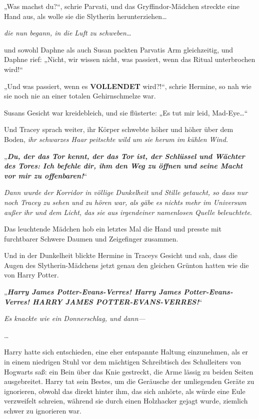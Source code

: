 {„Was machst du?“, schrie Parvati, und das Gryffindor-Mädchen streckte eine Hand aus, als wolle sie die Slytherin herunterziehen…

\emph{die nun begann, in die Luft zu schweben…}

und sowohl Daphne als auch Susan packten Parvatis Arm gleichzeitig, und Daphne rief: „Nicht, wir wissen nicht, was passiert, wenn das Ritual unterbrochen wird!“

„Und was passiert, wenn es \textbf{VOLLENDET} wird?!“, schrie Hermine, so nah wie sie noch nie an einer totalen Gehirnschmelze war.

Susans Gesicht war kreidebleich, und sie flüsterte: „Es tut mir leid, Mad-Eye…“

Und Tracey sprach weiter, ihr Körper schwebte höher und höher über dem Boden, \emph{ihr schwarzes Haar peitschte wild um sie herum im kühlen Wind.}

„\textbf{\emph{Du, der das Tor kennt, der das Tor ist, der Schlüssel und Wächter des Tores: Ich befehle dir, ihm den Weg zu öffnen und seine Macht vor mir zu offenbaren!}}“

\emph{Dann wurde der Korridor in völlige Dunkelheit und Stille getaucht, so dass nur noch Tracey zu sehen und zu hören war, als gäbe es nichts mehr im Universum außer ihr und dem Licht, das sie aus irgendeiner namenlosen Quelle beleuchtete}.

Das leuchtende Mädchen hob ein letztes Mal die Hand und presste mit furchtbarer Schwere Daumen und Zeigefinger zusammen.

Und in der Dunkelheit blickte Hermine in Traceys Gesicht und sah, dass die Augen des Slytherin-Mädchens jetzt genau den gleichen Grünton hatten wie die von Harry Potter.

„\textbf{\emph{Harry James Potter-Evans-Verres! Harry James Potter-Evans-Verres! HARRY JAMES POTTER-EVANS-VERRES!}}“

\emph{Es knackte wie ein Donnerschlag, und dann—}

…

Harry hatte sich entschieden, eine eher entspannte Haltung einzunehmen, als er in einem niedrigen Stuhl vor dem mächtigen Schreibtisch des Schulleiters von Hogwarts saß: ein Bein über das Knie gestreckt, die Arme lässig zu beiden Seiten ausgebreitet. Harry tat sein Bestes, um die Geräusche der umliegenden Geräte zu ignorieren, obwohl das direkt hinter ihm, das sich anhörte, als würde eine Eule verzweifelt schreien, während sie durch einen Holzhacker gejagt wurde, ziemlich schwer zu ignorieren war.

}
